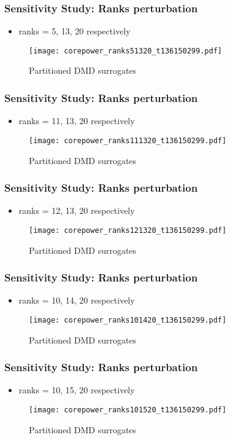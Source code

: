\documentclass[fleqn]{beamer}
\begin{document}
\begin{frame}
\frametitle{Sensitivity Study: Ranks perturbation}
\begin{itemize}
 \item ranks = 5, 13, 20 respectively
\end{itemize}

\begin{figure}[ht]

\texttt{[image: corepower\_ranks51320\_t136150299.pdf]}
\caption{Partitioned DMD surrogates}
\end{figure}
\end{frame}

\begin{frame}
\frametitle{Sensitivity Study: Ranks perturbation}
\begin{itemize}
 \item ranks = 11, 13, 20 respectively
\end{itemize}
\begin{figure}[ht]
\texttt{[image: corepower\_ranks111320\_t136150299.pdf]}
\caption{Partitioned DMD surrogates}
\end{figure}
\end{frame}

\begin{frame}
\frametitle{Sensitivity Study: Ranks perturbation}
\begin{itemize}
 \item ranks = 12, 13, 20 respectively
\end{itemize}

\begin{figure}[ht]

\texttt{[image: corepower\_ranks121320\_t136150299.pdf]}
\caption{Partitioned DMD surrogates}
\end{figure}
\end{frame}

\begin{frame}
\frametitle{Sensitivity Study: Ranks perturbation}
\begin{itemize}
 \item ranks = 10, 14, 20 respectively
\end{itemize}
\begin{figure}[ht]
\texttt{[image: corepower\_ranks101420\_t136150299.pdf]}
\caption{Partitioned DMD surrogates}
\end{figure}
\end{frame}

\begin{frame}
\frametitle{Sensitivity Study: Ranks perturbation}
\begin{itemize}
 \item ranks = 10, 15, 20 respectively
\end{itemize}
\begin{figure}[ht]
\texttt{[image: corepower\_ranks101520\_t136150299.pdf]}
\caption{Partitioned DMD surrogates}
\end{figure}
\end{frame}
\end{document}
